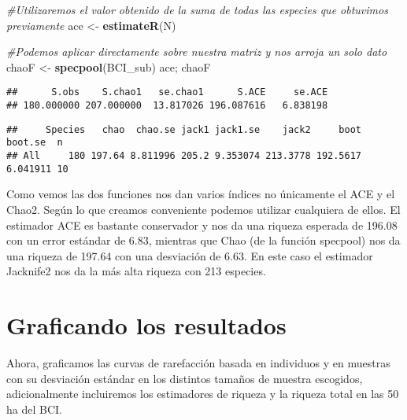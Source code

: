 \documentclass[]{book}
\newenvironment{Shaded}{\begin{snugshade}}{\end{snugshade}}
\newcommand{\KeywordTok}[1]{\textcolor[rgb]{0.13,0.29,0.53}{\textbf{{#1}}}}
\newcommand{\StringTok}[1]{\textcolor[rgb]{0.31,0.60,0.02}{{#1}}}
\newcommand{\CommentTok}[1]{\textcolor[rgb]{0.56,0.35,0.01}{\textit{{#1}}}}
\newcommand{\NormalTok}[1]{{#1}}
\begin{document}
\begin{Shaded}
\begin{Highlighting}[]
\CommentTok{#Utilizaremos el valor obtenido de la suma de todas las especies que obtuvimos previamente}
\NormalTok{ace <-}\StringTok{ }\KeywordTok{estimateR}\NormalTok{(N)}

\CommentTok{#Podemos aplicar directamente sobre nuestra matriz y nos arroja un solo dato}
\NormalTok{chaoF <-}\StringTok{ }\KeywordTok{specpool}\NormalTok{(BCI_sub) }
\NormalTok{ace; chaoF}
\end{Highlighting}
\end{Shaded}

\begin{verbatim}
##      S.obs    S.chao1   se.chao1      S.ACE     se.ACE 
## 180.000000 207.000000  13.817026 196.087616   6.838198
\end{verbatim}

\begin{verbatim}
##     Species   chao  chao.se jack1 jack1.se    jack2     boot  boot.se  n
## All     180 197.64 8.811996 205.2 9.353074 213.3778 192.5617 6.041911 10
\end{verbatim}

Como vemos las dos funciones nos dan varios índices no únicamente el ACE
y el Chao2. Según lo que creamos conveniente podemos utilizar cualquiera
de ellos. El estimador ACE es bastante conservador y nos da una riqueza
esperada de 196.08 con un error estándar de 6.83, mientras que Chao (de
la función specpool) nos da una riqueza de 197.64 con una desviación de
6.63. En este caso el estimador Jacknife2 nos da la más alta riqueza con
213 especies.

\section{Graficando los resultados}\label{graficando-los-resultados}

Ahora, graficamos las curvas de rarefacción basada en individuos y en
muestras con su desviación estándar en los distintos tamaños de muestra
escogidos, adicionalmente incluiremos los estimadores de riqueza y la
riqueza total en las 50 ha del BCI.
\end{document}
